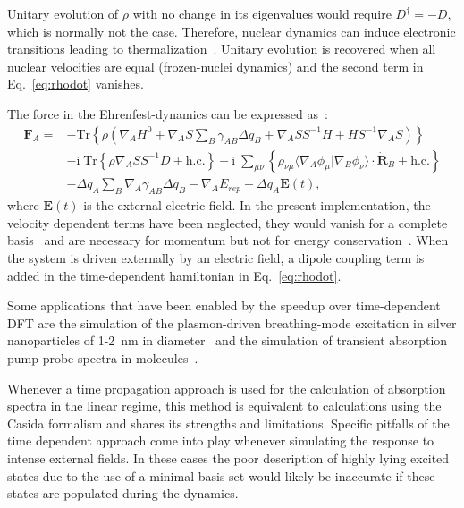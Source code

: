 \documentclass[reprint,onecolumn,superscriptaddress]{revtex4-1}
\begin{document}
Unitary evolution of $\rho$ with no change in its eigenvalues would require
$D^\dagger = -D$, which is normally not the case. Therefore, nuclear dynamics
can induce electronic transitions leading to
thermalization~\cite{Lin2009d}. Unitary evolution is recovered when all nuclear
velocities are equal (frozen-nuclei dynamics) and the second term in
Eq.~\ref{eq:rhodot} vanishes.

The force in the Ehrenfest-dynamics can be expressed
as~\cite{Todorov:2001ex,Niehaus:2005da}:
%
\begin{align}
  \mathbf{F}_A =& -\mathrm{Tr} \left\{ \rho \left( \nabla_A H^0 + \nabla_A S
  \sum_B \gamma_{AB} \Delta q_B + \nabla_A S S^{-1} H + H S^{-1} \nabla_A S
  \right) \right\} \nonumber \\ &- \mathrm{i} \; \mathrm{Tr} \left\{ \rho
  \nabla_A S S^{-1} D + \mathrm{h.c.} \right\} + \mathrm{i} \; \sum_{\mu \nu}
  \left\{ \rho_{\nu \mu} \langle \nabla_A \phi_{\mu} | \nabla_B \phi_{\nu}
  \rangle \cdot \dot{\mathbf{R}}_B + \mathrm{h.c.} \right\} \nonumber \\ &-
  \Delta q_A \sum_{B} \nabla_A \gamma_{AB} \Delta q_B - \nabla_A E_{rep} -
  \Delta q_A \mathbf{E}(t),
  \label{eq:ehrenforces}
\end{align}
where $\mathbf{E}(t)$ is the external electric field. In the present
implementation, the velocity dependent terms have been neglected, they would
vanish for a complete basis~\cite{Niehaus:2005da} and are necessary for momentum
but not for energy conservation~\cite{Todorov:2001ex}.  When the system is
driven externally by an electric field, a dipole coupling term is added in the
time-dependent hamiltonian in Eq.~\ref{eq:rhodot}.

Some applications that have been enabled by the speedup over time-dependent DFT
are the simulation of the plasmon-driven breathing-mode excitation in silver
nanoparticles of 1-2~nm in diameter~\cite{Bonafe2017a} and the simulation of
transient absorption pump-probe spectra in
molecules~\cite{Bonafe2018,Hernandez2019}.

Whenever a time propagation approach is used for the calculation of absorption
spectra in the linear regime, this method is equivalent to calculations using
the Casida formalism and shares its strengths and limitations. Specific pitfalls
of the time dependent approach come into play whenever simulating the response
to intense external fields. In these cases the poor description of highly lying
excited states due to the use of a minimal basis set would likely be inaccurate
if these states are populated during the dynamics.
\end{document}
